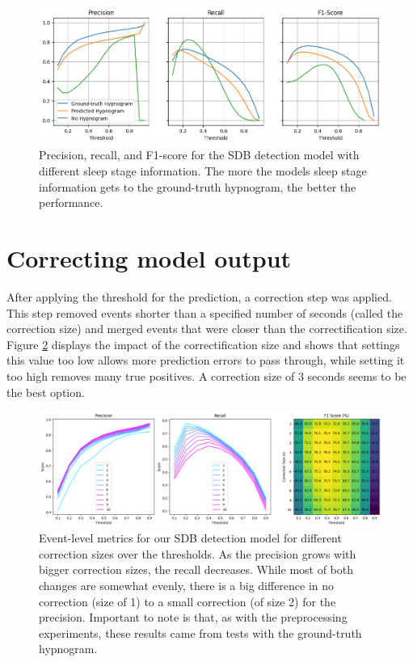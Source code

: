 \begin{figure}
    \centering
    \includegraphics[width=\textwidth]{images/SleepStages}
    \caption{Precision, recall, and F1-score for the SDB detection model with different sleep stage information. The more the models sleep stage information gets to the ground-truth hypnogram, the better the performance.}
    \label{fig:sleep-stage-importance}
\end{figure}

\section{Correcting model output}

After applying the threshold for the prediction, a correction step was applied. This step removed events shorter than a specified number of seconds (called the correction size) and merged events that were closer than the correctification size. Figure \ref{fig:correction-size} displays the impact of the correctification size and shows that settings this value too low allows more prediction errors to pass through, while setting it too high removes many true positives. A correction size of 3 seconds seems to be the best option.

\begin{figure}
    \centering
    \includegraphics[width=\textwidth]{images/CorSizeMetrics}
    \caption{Event-level metrics for our SDB detection model for different correction sizes over the thresholds. As the precision grows with bigger correction sizes, the recall decreases. While most of both changes are somewhat evenly, there is a big difference in no correction (size of 1) to a small correction (of size 2) for the precision. Important to note is that, as with the preprocessing experiments, these results came from tests with the ground-truth hypnogram.}
    \label{fig:correction-size}
\end{figure}
